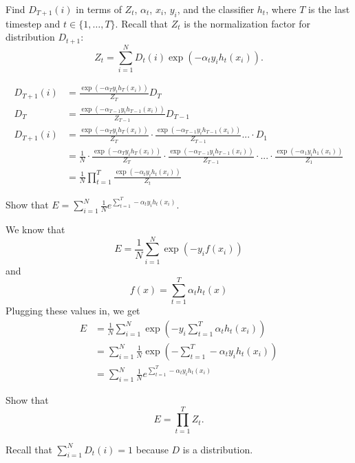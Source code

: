 \newpage

\problem[3]
Find $D_{T + 1}(i)$ in terms of $Z_t$, $\alpha_t$, $x_i$, $y_i$, and the classifier $h_t$, where $T$ is the last timestep and $t \in \{1, \ldots, T\}$. Recall that $Z_t$ is the normalization factor for distribution $D_{t+1}$:
$$Z_t = \sum\limits_{i=1}^N D_t(i) \exp(-\alpha_{t}y_{i}h_{t}(x_{i})).$$

\begin{solution}
    \begin{align*}
        D_{T+1}(i) &= \frac{\exp(-\alpha_T y_i h_T(x_i))}{Z_T} D_T\\
        D_T &= \frac{\exp(-\alpha_{T-1} y_i h_{T-1}(x_i))}{Z_{T-1}} D_{T-1}\\
        D_{T+1}(i) &= \frac{\exp(-\alpha_T y_i h_T(x_i))}{Z_T} \cdot \frac{\exp(-\alpha_{T-1} y_i h_{T-1}(x_i))}{Z_{T-1}} ... \cdot D_1\\
        &= \frac{1}{N} \cdot \frac{\exp(-\alpha_T y_i h_T(x_i))}{Z_T} \cdot \frac{\exp(-\alpha_{T-1} y_i h_{T-1}(x_i))}{Z_{T-1}} \cdot ... \cdot \frac{\exp(-\alpha_1 y_i h_1(x_i))}{Z_1}\\
        &= \frac{1}{N} \prod_{t = 1}^T \frac{\exp(-\alpha_t y_i h_t(x_i))}{Z_t}
    \end{align*}
\end{solution}

\problem[2]
Show that $E = \sum_{i=1}^N  \frac{1}{N} e^{\sum_{t=1}^T -\alpha_t y_i h_t(x_i)}.$

\begin{solution}
    We know that 
    \[
        E = \frac{1}{N} \sum_{i=1}^N \exp(-y_{i}f(x_i))
    \]
    and
    \[
        f(x) = \sum_{t=1}^T \alpha_t h_t(x)
    \]
    Plugging these values in, we get
    \begin{align*}
        E &= \frac{1}{N} \sum_{i=1}^N \exp(-y_{i} \sum_{t=1}^T \alpha_t h_t(x_i))\\
        &= \sum_{i=1}^N  \frac{1}{N} \exp(-\sum_{t=1}^T - \alpha_t y_i h_t(x_i))\\
        &= \sum_{i=1}^N  \frac{1}{N} e^{\sum_{t=1}^T - \alpha_t y_i h_t(x_i)}
    \end{align*}
\end{solution}

\problem[5]
Show that
$$E = \prod\limits_{t=1}^T Z_t.$$

\begin{hint}
	Recall that $\sum_{i = 1}^N D_t(i) = 1$ because $D$ is a distribution.
\end{hint}

